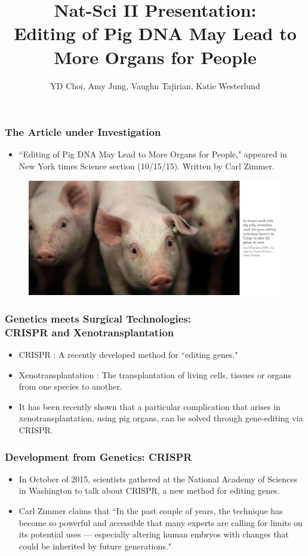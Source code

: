 \documentclass{beamer}
\title{Nat-Sci II Presentation: \\
Editing of Pig DNA May Lead to More Organs for People}
\author{YD Choi, Amy Jung, Vaughn Tajirian, Katie Westerlund }
\institute{New York University}
\begin{document}
 
\frame{\titlepage} 

\begin{frame}
\frametitle{The Article under Investigation}
\begin{itemize} 
\item ``Editing of Pig DNA May Lead to More Organs for People," appeared in
New York times Science section (10/15/15). Written by Carl Zimmer.
\end{itemize}
\begin{figure}[h!]
  \centering
    \includegraphics[width=1\textwidth]{edit-pigs.png}
\end{figure}
\end{frame}

\begin{frame}
\frametitle{Genetics meets Surgical Technologies: \\
CRISPR and Xenotransplantation}
\begin{itemize}
\item CRISPR : A recently developed method for 
``editing genes."
\item Xenotransplantation :
The transplantation of living cells, tissues or organs
from one species to another. 
\item It has been recently shown that a particular
complication that arises in
xenotransplantation, using pig organs,
can be solved through gene-editing via CRISPR. 
\end{itemize}
\end{frame}

\begin{frame}
\frametitle{Development from Genetics: CRISPR}
\begin{itemize}
\item In October of 2015, scientists gathered at the National Academy of Sciences
in Washington to talk about CRISPR, a new method for editing genes.

\item Carl Zimmer claims that ``In the past couple of years, 
the technique has become so powerful and accessible that many experts are 
calling for limits on its potential uses — especially altering human 
embryos with changes that could be inherited by future generations."
\end{itemize}
\end{frame}
\end{document}

